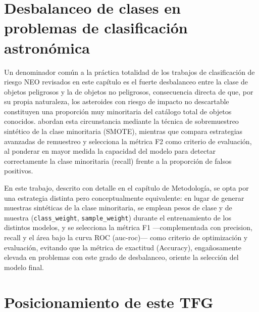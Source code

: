 \documentclass[12pt]{report} %
\begin{document}
\section{Desbalanceo de clases en problemas de clasificación astronómica}

Un denominador común a la práctica totalidad de los trabajos de clasificación de riesgo NEO revisados en este capítulo es el fuerte desbalanceo entre la clase de objetos peligrosos y la de objetos no peligrosos, consecuencia directa de que, por su propia naturaleza, los asteroides con riesgo de impacto no descartable constituyen una proporción muy minoritaria del catálogo total de objetos conocidos. \cite{mondal2025multimodel} abordan esta circunstancia mediante la técnica de sobremuestreo sintético de la clase minoritaria (SMOTE), mientras que \cite{chandra2025enhanced} compara estrategias avanzadas de remuestreo y selecciona la métrica F2 como criterio de evaluación, al ponderar en mayor medida la capacidad del modelo para detectar correctamente la clase minoritaria (recall) frente a la proporción de falsos positivos.

En este trabajo, descrito con detalle en el capítulo de Metodología, se opta por una estrategia distinta pero conceptualmente equivalente: en lugar de generar muestras sintéticas de la clase minoritaria, se emplean pesos de clase y de muestra (\texttt{class\_weight}, \texttt{sample\_weight}) durante el entrenamiento de los distintos modelos, y se selecciona la métrica F1 ---complementada con precision, recall y el área bajo la curva ROC (\gls{auc}-\gls{roc})--- como criterio de optimización y evaluación, evitando que la métrica de exactitud (Accuracy), engañosamente elevada en problemas con este grado de desbalanceo, oriente la selección del modelo final.

\section{Posicionamiento de este TFG}
\end{document}
